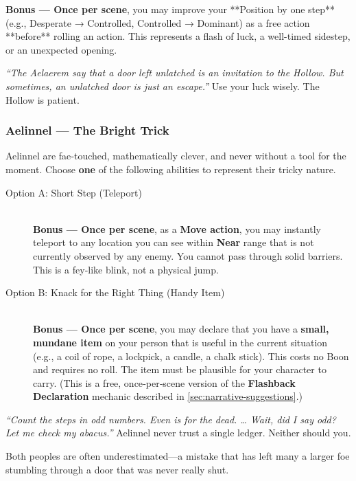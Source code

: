 \textbf{Bonus — Once per scene}, you may improve your **Position by one step** (e.g., Desperate → Controlled, Controlled → Dominant) as a free action **before** rolling an action. This represents a flash of luck, a well-timed sidestep, or an unexpected opening.

\begin{tcolorbox}[colback=green!5!white,colframe=green!70!black,title=From the Hearth Ledger]
\emph{“The Aelaerem say that a door left unlatched is an invitation to the Hollow. But sometimes, an unlatched door is just an escape.”}  
Use your luck wisely. The Hollow is patient.
\end{tcolorbox}

\subsubsection*{Aelinnel — The Bright Trick}
\label{sec:aelinnel}
Aelinnel are fae‑touched, mathematically clever, and never without a tool for the moment.
Choose \textbf{one} of the following abilities to represent their tricky nature.

\begin{description}
  \item[Option A: Short Step (Teleport)] \hfill \\
  \textbf{Bonus — Once per scene}, as a \textbf{Move action}, you may instantly teleport to any location you can see within \textbf{Near} range that is not currently observed by any enemy. You cannot pass through solid barriers. This is a fey‑like blink, not a physical jump.
  
  \item[Option B: Knack for the Right Thing (Handy Item)] \hfill \\
  \textbf{Bonus — Once per scene}, you may declare that you have a \textbf{small, mundane item} on your person that is useful in the current situation (e.g., a coil of rope, a lockpick, a candle, a chalk stick). This costs no Boon and requires no roll. The item must be plausible for your character to carry. (This is a free, once‑per‑scene version of the \textbf{Flashback Declaration} mechanic described in \ref{sec:narrative-suggestions}.)
\end{description}

\begin{tcolorbox}[colback=cyan!5!white,colframe=cyan!70!black,title=A Gnomish Maxim]
\emph{“Count the steps in odd numbers. Even is for the dead. … Wait, did I say odd? Let me check my abacus.”}  
Aelinnel never trust a single ledger. Neither should you.
\end{tcolorbox}

\noindent Both peoples are often underestimated—a mistake that has left many a larger foe stumbling through a door that was never really shut.
